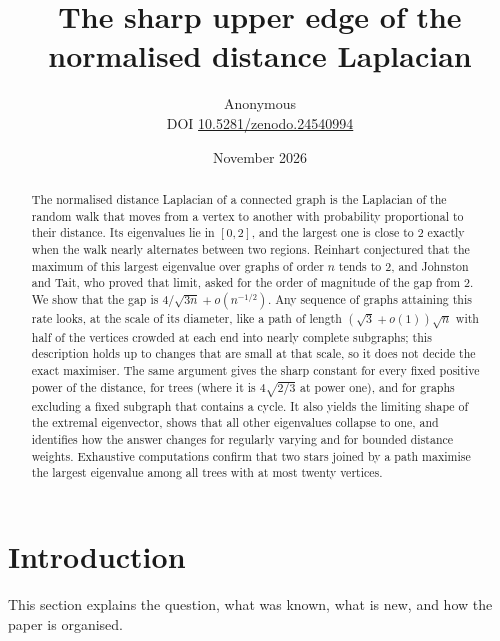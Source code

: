 \documentclass[11pt,a4paper]{article}
\title{The sharp upper edge of the normalised distance Laplacian}
\author{Anonymous\\[3pt]{\small DOI \href{https://doi.org/10.5281/zenodo.24540994}{10.5281/zenodo.24540994}}}
\date{November 2026}
\theoremstyle{definition}
\begin{document}
\maketitle
\begin{abstract}
The normalised distance Laplacian of a connected graph is the Laplacian of the random walk that moves from a vertex to another with probability proportional to their distance. Its eigenvalues lie in $[0,2]$, and the largest one is close to $2$ exactly when the walk nearly alternates between two regions. Reinhart conjectured that the maximum of this largest eigenvalue over graphs of order $n$ tends to $2$, and Johnston and Tait, who proved that limit, asked for the order of magnitude of the gap from $2$. We show that the gap is $4/\sqrt{3n}+o(n^{-1/2})$. Any sequence of graphs attaining this rate looks, at the scale of its diameter, like a path of length $(\sqrt3+o(1))\sqrt n$ with half of the vertices crowded at each end into nearly complete subgraphs; this description holds up to changes that are small at that scale, so it does not decide the exact maximiser. The same argument gives the sharp constant for every fixed positive power of the distance, for trees (where it is $4\sqrt{2/3}$ at power one), and for graphs excluding a fixed subgraph that contains a cycle. It also yields the limiting shape of the extremal eigenvector, shows that all other eigenvalues collapse to one, and identifies how the answer changes for regularly varying and for bounded distance weights. Exhaustive computations confirm that two stars joined by a path maximise the largest eigenvalue among all trees with at most twenty vertices.
\end{abstract}

\section{Introduction}
This section explains the question, what was known, what is new, and how the paper is organised.
\end{document}
